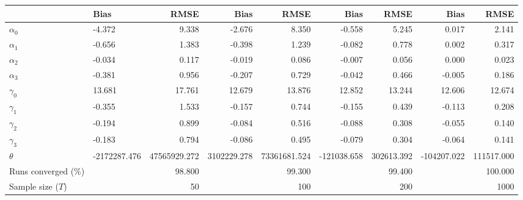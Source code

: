 
\begin{tabular}[t]{llrrrrrrr}
\toprule
  & Bias & RMSE & Bias & RMSE & Bias & RMSE & Bias & RMSE\\
\midrule
$\alpha_{0}$ & -4.372 & 9.338 & -2.676 & 8.350 & -0.558 & 5.245 & 0.017 & 2.141\\
$\alpha_{1}$ & -0.656 & 1.383 & -0.398 & 1.239 & -0.082 & 0.778 & 0.002 & 0.317\\
$\alpha_{2}$ & -0.034 & 0.117 & -0.019 & 0.086 & -0.007 & 0.056 & 0.000 & 0.023\\
$\alpha_{3}$ & -0.381 & 0.956 & -0.207 & 0.729 & -0.042 & 0.466 & -0.005 & 0.186\\
$\gamma_{0}$ & 13.681 & 17.761 & 12.679 & 13.876 & 12.852 & 13.244 & 12.606 & 12.674\\
$\gamma_{1}$ & -0.355 & 1.533 & -0.157 & 0.744 & -0.155 & 0.439 & -0.113 & 0.208\\
$\gamma_{2}$ & -0.194 & 0.899 & -0.084 & 0.516 & -0.088 & 0.308 & -0.055 & 0.140\\
$\gamma_{3}$ & -0.183 & 0.794 & -0.086 & 0.495 & -0.079 & 0.304 & -0.064 & 0.141\\
$\theta$ & -2172287.476 & 47565929.272 & 3102229.278 & 73361681.524 & -121038.658 & 302613.392 & -104207.022 & 111517.000\\
Runs converged (\%) &  & 98.800 &  & 99.300 &  & 99.400 &  & 100.000\\
Sample size ($T$) &  & 50 &  & 100 &  & 200 &  & 1000\\
\bottomrule
\end{tabular}
